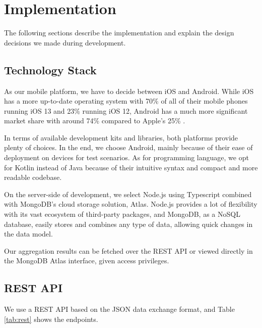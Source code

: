 
\chapter{Implementation}\label{chapter:implementation}

The following sections describe the implementation and explain the design decisions we made during development. 

\section{Technology Stack}

As our mobile platform, we have to decide between iOS and Android. While iOS has a more up-to-date operating system with 70\% of all of their mobile phones running iOS 13 and 23\% running iOS 12, Android has a much more significant market share with around 74\% compared to Apple's 25\% \cite{android1}\cite{android2}.

In terms of available development kits and libraries, both platforms provide plenty of choices. In the end, we choose Android, mainly because of their ease of deployment on devices for test scenarios. As for programming language, we opt for Kotlin instead of Java because of their intuitive syntax and compact and more readable codebase.

On the server-side of development, we select Node.js \cite{node} using Typescript combined with MongoDB's \cite{mongo} cloud storage solution, Atlas. Node.js provides a lot of flexibility with its vast ecosystem of third-party packages, and MongoDB, as a NoSQL database, easily stores and combines any type of data, allowing quick changes in the data model.

Our aggregation results can be fetched over the REST API or viewed directly in the MongoDB Atlas interface, given access privileges.

\section{REST API}
\label{sec:api}
We use a REST API based on the JSON data exchange format, and Table \ref{tab:rest} shows the endpoints.

